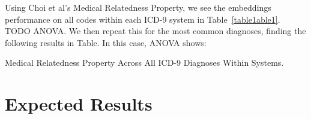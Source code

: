 \documentclass[10pt]{article}
\begin{document}

Using Choi et al's Medical Relatedness Property, we see the embeddings performance on all codes within each ICD-9 system in Table~\ref{table1able1}. TODO ANOVA. We then repeat this for the most common diagnoses, finding the following results in Table. In this case, ANOVA shows:

\begin{table*}
	\begin{center}
		\caption{Medical Relatedness Property Across All ICD-9 Diagnoses Within Systems.}
		\label{table1}
  \end{center}
\end{table*}





\section{Expected Results}
\end{document}
